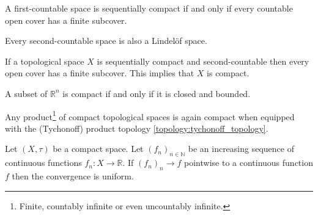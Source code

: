     
    \begin{property}
    	A first-countable space is sequentially compact if and only if every countable open cover has a finite subcover.
    \end{property}
    
    \begin{property}
    	Every second-countable space is also a Lindel\"of space.
    \end{property}
    
    
	\begin{theorem}
	    	If a topological space $X$ is sequentially compact and second-countable then every open cover has a finite subcover. This implies that $X$ is compact.
	\end{theorem}
	\begin{theorem}
    		A subset of $\mathbb{R}^n$ is compact if and only if it is closed and bounded.
	\end{theorem}
	
	\begin{theorem}
		Any product\footnote{Finite, countably infinite or even uncountably infinite.} of compact topological spaces is again compact when equipped with the (Tychonoff) product topology \ref{topology:tychonoff_topology}.
	\end{theorem}
	

    
	\begin{theorem}
    		Let $(X, \tau)$ be a compact space. Let $(f_n)_{n\in\mathbb{N}}$ be an increasing sequence of continuous functions $f_n:X\rightarrow\mathbb{R}$. If $(f_n)_n\rightarrow f$ pointwise to a continuous function $f$ then the convergence is uniform.
	\end{theorem}
    
